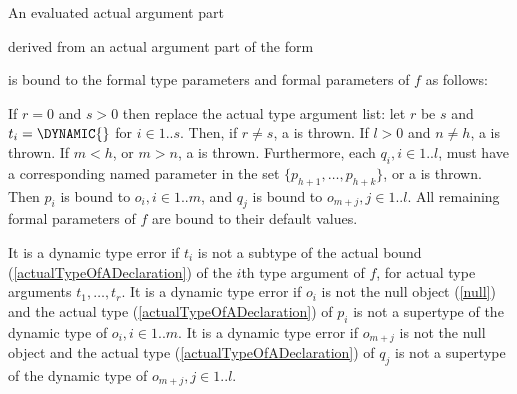 \documentclass[makeidx]{article}
\begin{document}
\LMHash{}%
An evaluated actual argument part


\noindent
derived from an actual argument part of the form


\noindent
is bound to the formal type parameters and formal parameters of $f$ as follows:

\LMHash{}%
If $r = 0$ and $s > 0$ then replace the actual type argument list:
let $r$ be $s$ and $t_i = \DYNAMIC{}$ for $i \in 1 .. s$.
Then, if $r \not= s$, a  is thrown.
If $l > 0$ and $n \not= h$, a  is thrown.
If $m < h$, or $m > n$, a  is thrown.
Furthermore, each
$q_i, i \in 1 .. l$,
must have a corresponding named parameter in the set
$\{p_{h+1}, \ldots, p_{h+k}\}$,
or a  is thrown.
Then $p_i$ is bound to
$o_i, i \in 1 .. m$,
and $q_j$ is bound to $o_{m+j}, j \in 1 .. l$.
All remaining formal parameters of $f$ are bound to their default values.


\LMHash{}%
It is a dynamic type error if $t_i$ is not a subtype of the actual bound
(\ref{actualTypeOfADeclaration})
of the $i$th type argument of $f$, for actual type arguments $t_1, \ldots, t_r$.
It is a dynamic type error if $o_i$ is not the null object (\ref{null})
and the actual type
(\ref{actualTypeOfADeclaration})
of $p_i$ is not a supertype of the dynamic type of $o_i, i \in 1 .. m$.
It is a dynamic type error if $o_{m+j}$ is
not the null object and the actual type
(\ref{actualTypeOfADeclaration})
of $q_j$ is not a supertype of the dynamic type of $o_{m+j}, j \in 1 .. l$.
\end{document}
